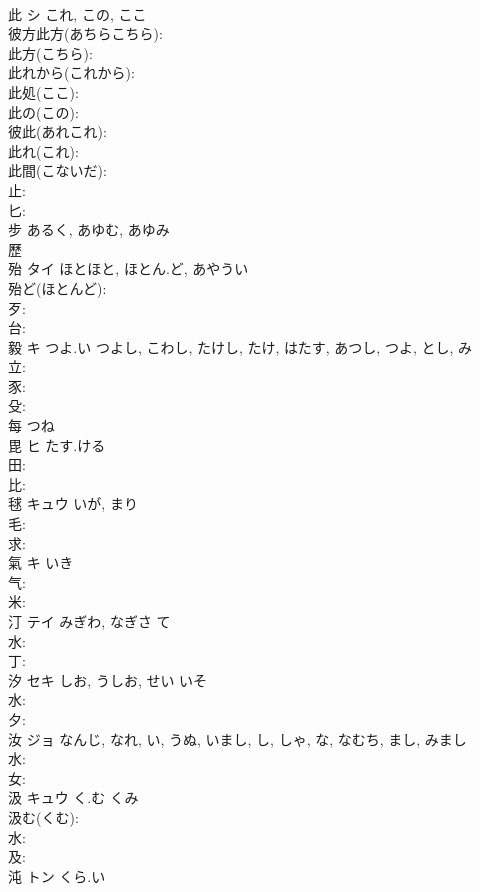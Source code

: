 \documentclass[8pt]{extreport}
\begin{document}
\begin{CJK}{UTF8}{min}
\\	此	シ	これ, この, ここ		
\\	彼方此方(あちらこちら): 
\\	此方(こちら): 
\\	此れから(これから): 
\\	此処(ここ): 
\\	此の(この): 
\\	彼此(あれこれ): 
\\	此れ(これ): 
\\	此間(こないだ): 
\\	止: 
\\	匕: 
\\	步		あるく, あゆむ, あゆみ				
\\	歷						
\\	殆	タイ	ほとほと, ほとん.ど, あやうい		
\\	殆ど(ほとんど): 
\\	歹: 
\\	台: 
\\	毅	キ	つよ.い	つよし, こわし, たけし, たけ, はたす, あつし, つよ, とし, み	
\\	立: 
\\	豕: 
\\	殳: 
\\	每		つね				
\\	毘	ヒ	たす.ける		
\\	田: 
\\	比: 
\\	毬	キュウ	いが, まり		
\\	毛: 
\\	求: 
\\	氣	キ	いき		
\\	气: 
\\	米: 
\\	汀	テイ	みぎわ, なぎさ	て	
\\	水: 
\\	丁: 
\\	汐	セキ	しお, うしお, せい	いそ	
\\	水: 
\\	夕: 
\\	汝	ジョ	なんじ, なれ, い, うぬ, いまし, し, しゃ, な, なむち, まし, みまし		
\\	水: 
\\	女: 
\\	汲	キュウ	く.む	くみ	
\\	汲む(くむ): 
\\	水: 
\\	及: 
\\	沌	トン	くら.い		

\end{CJK}
\end{document}
